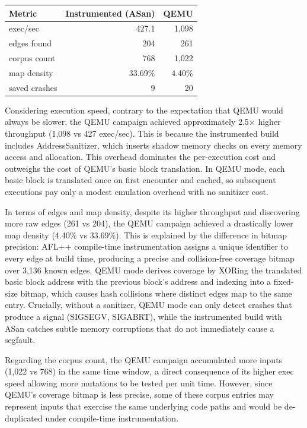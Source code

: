 \begin{center}
\begin{tabular}{lrr}
\hline
\textbf{Metric} & \textbf{Instrumented (ASan)} & \textbf{QEMU} \\
\hline
exec/sec      & 427.1   & 1{,}098          \\
edges found   & 204     & 261              \\
corpus count  & 768     & 1{,}022          \\
map density   & 33.69\% & 4.40\%           \\
saved crashes & 9       & 20               \\
\hline
\end{tabular}
\end{center}

Considering execution speed, contrary to the expectation that QEMU would always be slower, the
QEMU campaign achieved approximately 2.5$\times$ higher throughput
(1{,}098 vs 427 exec/sec). This is because the instrumented build
includes AddressSanitizer, which inserts shadow memory checks on
every memory access and allocation. This overhead dominates the
per-execution cost and outweighs the cost of QEMU's basic block
translation. In QEMU mode, each basic block is translated once on
first encounter and cached, so subsequent executions pay only a
modest emulation overhead with no sanitizer cost.

In terms of edges and map density, despite its higher throughput and discovering more raw edges (261
vs 204), the QEMU campaign achieved a drastically lower map density
(4.40\% vs 33.69\%). This is explained by the difference in bitmap
precision: AFL++ compile-time instrumentation assigns a unique
identifier to every edge at build time, producing a precise and
collision-free coverage bitmap over 3,136 known edges. QEMU mode
derives coverage by XORing the translated basic block address with
the previous block's address and indexing into a fixed-size bitmap,
which causes hash collisions where distinct edges map to the same
entry. Crucially, without a sanitizer, QEMU mode can only detect
crashes that produce a signal (SIGSEGV, SIGABRT), while the
instrumented build with ASan catches subtle memory corruptions that
do not immediately cause a segfault.

Regarding the corpus count, the QEMU campaign accumulated more inputs (1{,}022 vs 768) in the
same time window, a direct consequence of its higher exec speed
allowing more mutations to be tested per unit time. However, since
QEMU's coverage bitmap is less precise, some of these corpus entries
may represent inputs that exercise the same underlying code paths
and would be de-duplicated under compile-time instrumentation.

